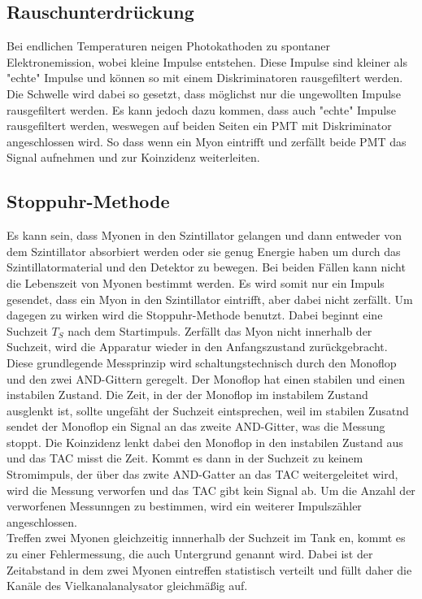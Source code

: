 \subsection{Rauschunterdrückung}
\label{subsec:Rauschunterdrückung}
Bei endlichen Temperaturen neigen Photokathoden zu spontaner Elektronemission, wobei kleine Impulse entstehen.
Diese Impulse sind kleiner als "echte" Impulse und können so mit einem Diskriminatoren rausgefiltert werden. Die Schwelle wird
dabei so gesetzt, dass möglichst nur die ungewollten Impulse rausgefiltert werden. Es kann jedoch dazu kommen, dass auch "echte"
Impulse rausgefiltert werden, weswegen auf beiden Seiten ein PMT mit Diskriminator angeschlossen wird. 
So dass wenn ein Myon eintrifft und zerfällt beide PMT das Signal aufnehmen und zur Koinzidenz weiterleiten.

\subsection{Stoppuhr-Methode}
\label{subsec:Messmethode}
Es kann sein, dass Myonen in den Szintillator gelangen und dann entweder von dem Szintillator absorbiert werden oder sie genug 
Energie haben um durch das Szintillatormaterial und den Detektor zu bewegen. Bei beiden Fällen kann nicht die Lebenszeit von Myonen bestimmt werden.
Es wird somit nur ein Impuls gesendet, dass ein Myon in den Szintillator eintrifft, aber dabei nicht zerfällt. Um dagegen zu wirken
wird die Stoppuhr-Methode benutzt. Dabei beginnt eine Suchzeit $T_S$ nach dem Startimpuls. Zerfällt das Myon nicht innerhalb der Suchzeit,
wird die Apparatur wieder in den Anfangszustand zurückgebracht.\\
Diese grundlegende Messprinzip wird schaltungstechnisch durch den Monoflop und den zwei AND-Gittern geregelt.
Der Monoflop hat einen stabilen und einen instabilen Zustand.
Die Zeit, in der der Monoflop im instabilem Zustand ausglenkt ist, sollte ungefäht der Suchzeit eintsprechen, weil im stabilen Zusatnd sendet
der Monoflop ein Signal an das zweite AND-Gitter, was die Messung stoppt.
Die Koinzidenz lenkt dabei den Monoflop in den instabilen Zustand aus und das TAC misst die Zeit. Kommt es dann in der Suchzeit zu keinem
Stromimpuls, der über das zwite AND-Gatter an das TAC weitergeleitet wird, wird die Messung verworfen und das TAC gibt kein Signal ab.
Um die Anzahl der verworfenen Messunngen zu bestimmen, wird ein weiterer Impulszähler angeschlossen.\\
Treffen zwei Myonen gleichzeitig innnerhalb der Suchzeit im Tank en, kommt es zu einer Fehlermessung, die auch Untergrund genannt wird.
Dabei ist der Zeitabstand in dem zwei Myonen eintreffen statistisch verteilt und füllt daher die Kanäle des Vielkanalanalysator gleichmäßig auf.
